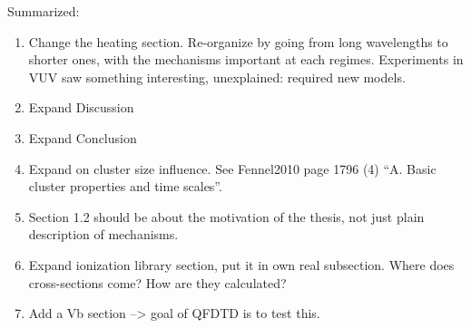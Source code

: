 Summarized:
\begin{enumerate}
\item Change the heating section. Re-organize by going from long wavelengths to
      shorter ones, with the mechanisms important at each regimes. Experiments
      in VUV saw something interesting, unexplained: required new models.
\item Expand Discussion
\item Expand Conclusion
\item Expand on cluster size influence. See Fennel2010\cite{Fennel2010} page 1796 (4)
      ``A. Basic cluster properties and time scales''.
\item Section 1.2 should be about the motivation of the thesis, not just plain
      description of mechanisms.
\item Expand ionization library section, put it in own real subsection. Where
      does cross-sections come? How are they calculated?
\item Add a Vb section --> goal of QFDTD is to test this.
\end{enumerate}


\newpage
{}
{}
\listoffixmes

